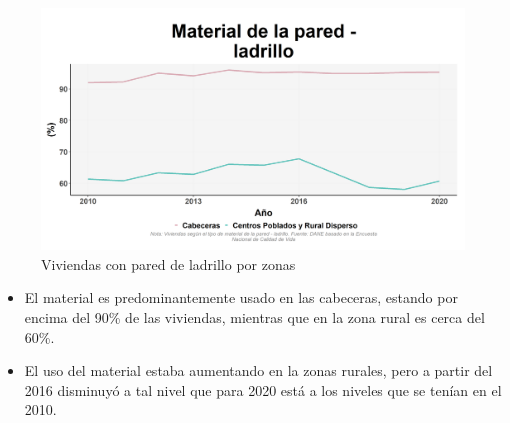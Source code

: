     \begin{figure}[H]
        \caption{Viviendas con pared de ladrillo por zonas \label{map_result_2} }
        \begin{center}
        \includegraphics[width=\textwidth,keepaspectratio]{img/var_151_trend.png}
        \end{center}
    \end{figure}
            \begin{itemize}
                    \item El material es predominantemente usado en las cabeceras, estando por encima del 90\% de las viviendas, mientras que en la zona rural es cerca del 60\%.
                    \item El uso del material estaba aumentando en la zonas rurales, pero a partir del 2016 disminuyó a tal nivel que para 2020 está a los niveles que se tenían en el 2010.
                    \end{itemize}

